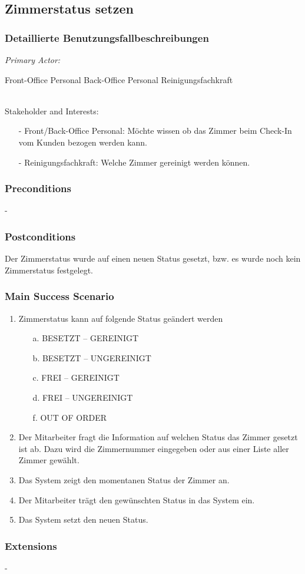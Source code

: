 \documentclass[./detailed_overview_usecases.tex]{subfiles}
\begin{document}
    \subsection{Zimmerstatus setzen}
    \subsubsection{Detaillierte Benutzungsfallbeschreibungen}
    \textit{Primary Actor:}
    \begin{enumerate}
        Front-Office Personal
        Back-Office Personal
        Reinigungsfachkraft
    \end{enumerate}
    \\
    Stakeholder and Interests:
    \begin{itemize}
        \item[-] Front/Back-Office Personal: Möchte wissen ob das Zimmer beim Check-In vom Kunden bezogen werden kann.
        \item[-] Reinigungsfachkraft: Welche Zimmer gereinigt werden können.
    \end{itemize}

    \subsubsection*{Preconditions}
    -
    \subsubsection*{Postconditions}
    Der Zimmerstatus wurde auf einen neuen Status gesetzt, bzw. es wurde noch kein Zimmerstatus festgelegt.

    \subsubsection*{Main Success Scenario}
    \begin{enumerate}
        \item Zimmerstatus kann auf folgende Status geändert werden
        \begin{itemize}
            \item[a.] BESETZT – GEREINIGT
            \item[b.] BESETZT – UNGEREINIGT
            \item[c.] FREI – GEREINIGT
            \item[d.] FREI – UNGEREINIGT
            \item[f.] OUT OF ORDER
        \end{itemize}
        \item Der Mitarbeiter fragt die Information auf welchen Status das Zimmer gesetzt ist ab. Dazu wird die Zimmernummer eingegeben oder aus einer Liste aller Zimmer gewählt.
        \item Das System zeigt den momentanen Status der Zimmer an.
        \item Der Mitarbeiter trägt den gewünschten Status in das System ein.
        \item Das System setzt den neuen Status.
    \end{enumerate}

    \subsubsection*{Extensions}
    -
\end{document}
